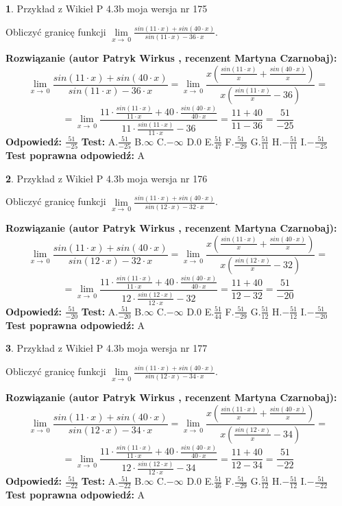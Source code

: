 \documentclass[12pt, a4paper]{article}
\theoremstyle{definition} %
\newtheorem{zad}{}
\newcommand{\zadStart}[1]{\begin{zad}#1\newline}
\newcommand{\zadStop}{\end{zad}}
\newcommand{\rozwStart}[2]{\noindent \textbf{Rozwiązanie (autor #1 , recenzent #2): }\newline}
\newcommand{\rozwStop}{\newline}
\newcommand{\odpStart}{\noindent \textbf{Odpowiedź:}\newline}
\newcommand{\odpStop}{\newline}
\newcommand{\testStart}{\noindent \textbf{Test:}\newline}
\newcommand{\testStop}{\newline}
\newcommand{\kluczStart}{\noindent \textbf{Test poprawna odpowiedź:}\newline}
\newcommand{\kluczStop}{\newline}
\begin{document}
\zadStart{Przykład z Wikieł P 4.3b moja wersja nr 175}


Obliczyć granicę funkcji $\lim\limits_{x\to\ 0}\frac{sin(11 \cdot x)+sin(40 \cdot x)}{sin(11 \cdot x)-36 \cdot x}$.
\zadStop
\rozwStart{Patryk Wirkus}{Martyna Czarnobaj}
$$\lim\limits_{x\to\ 0}\frac{sin(11 \cdot x)+sin(40 \cdot x)}{sin(11 \cdot x)-36 \cdot x}=\lim\limits_{x\to\ 0}\frac{x(\frac{sin(11 \cdot x)}{x}+\frac{sin(40 \cdot x)}{x})}{x(\frac{sin(11 \cdot x)}{x}-36)}=$$
$$=\lim\limits_{x\to\ 0}\frac{11 \cdot \frac{sin(11 \cdot x)}{11 \cdot x}+40 \cdot \frac{sin(40 \cdot x)}{40 \cdot x}}{11 \cdot \frac{sin(11 \cdot x)}{11 \cdot x}-36}=\frac{11+40}{11-36} = \frac{51}{-25}$$
\rozwStop
\odpStart
$\frac{51}{-25}$
\odpStop
\testStart
A.$\frac{51}{-25}$
B.$\infty$
C.$-\infty$
D.$0$
E.$\frac{51}{47}$
F.$\frac{51}{-29}$
G.$\frac{51}{11}$
H.$-\frac{51}{11}$
I.$-\frac{51}{-25}$
\testStop
\kluczStart
A
\kluczStop



\zadStart{Przykład z Wikieł P 4.3b moja wersja nr 176}


Obliczyć granicę funkcji $\lim\limits_{x\to\ 0}\frac{sin(11 \cdot x)+sin(40 \cdot x)}{sin(12 \cdot x)-32 \cdot x}$.
\zadStop
\rozwStart{Patryk Wirkus}{Martyna Czarnobaj}
$$\lim\limits_{x\to\ 0}\frac{sin(11 \cdot x)+sin(40 \cdot x)}{sin(12 \cdot x)-32 \cdot x}=\lim\limits_{x\to\ 0}\frac{x(\frac{sin(11 \cdot x)}{x}+\frac{sin(40 \cdot x)}{x})}{x(\frac{sin(12 \cdot x)}{x}-32)}=$$
$$=\lim\limits_{x\to\ 0}\frac{11 \cdot \frac{sin(11 \cdot x)}{11 \cdot x}+40 \cdot \frac{sin(40 \cdot x)}{40 \cdot x}}{12 \cdot \frac{sin(12 \cdot x)}{12 \cdot x}-32}=\frac{11+40}{12-32} = \frac{51}{-20}$$
\rozwStop
\odpStart
$\frac{51}{-20}$
\odpStop
\testStart
A.$\frac{51}{-20}$
B.$\infty$
C.$-\infty$
D.$0$
E.$\frac{51}{44}$
F.$\frac{51}{-29}$
G.$\frac{51}{12}$
H.$-\frac{51}{12}$
I.$-\frac{51}{-20}$
\testStop
\kluczStart
A
\kluczStop



\zadStart{Przykład z Wikieł P 4.3b moja wersja nr 177}


Obliczyć granicę funkcji $\lim\limits_{x\to\ 0}\frac{sin(11 \cdot x)+sin(40 \cdot x)}{sin(12 \cdot x)-34 \cdot x}$.
\zadStop
\rozwStart{Patryk Wirkus}{Martyna Czarnobaj}
$$\lim\limits_{x\to\ 0}\frac{sin(11 \cdot x)+sin(40 \cdot x)}{sin(12 \cdot x)-34 \cdot x}=\lim\limits_{x\to\ 0}\frac{x(\frac{sin(11 \cdot x)}{x}+\frac{sin(40 \cdot x)}{x})}{x(\frac{sin(12 \cdot x)}{x}-34)}=$$
$$=\lim\limits_{x\to\ 0}\frac{11 \cdot \frac{sin(11 \cdot x)}{11 \cdot x}+40 \cdot \frac{sin(40 \cdot x)}{40 \cdot x}}{12 \cdot \frac{sin(12 \cdot x)}{12 \cdot x}-34}=\frac{11+40}{12-34} = \frac{51}{-22}$$
\rozwStop
\odpStart
$\frac{51}{-22}$
\odpStop
\testStart
A.$\frac{51}{-22}$
B.$\infty$
C.$-\infty$
D.$0$
E.$\frac{51}{46}$
F.$\frac{51}{-29}$
G.$\frac{51}{12}$
H.$-\frac{51}{12}$
I.$-\frac{51}{-22}$
\testStop
\kluczStart
A
\kluczStop
\end{document}
